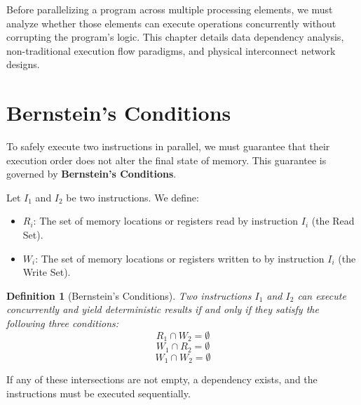 \documentclass[12pt,a4paper,openany]{book}
\newtheorem{definition}{Definition}[chapter]
\begin{document}
Before parallelizing a program across multiple processing elements, we must analyze whether those elements can execute operations concurrently without corrupting the program's logic. This chapter details data dependency analysis, non-traditional execution flow paradigms, and physical interconnect network designs.

\section{Bernstein's Conditions}
To safely execute two instructions in parallel, we must guarantee that their execution order does not alter the final state of memory. This guarantee is governed by \textbf{Bernstein's Conditions}.

Let $I_1$ and $I_2$ be two instructions. We define:
\begin{itemize}
    \item $R_i$: The set of memory locations or registers read by instruction $I_i$ (the Read Set).
    \item $W_i$: The set of memory locations or registers written to by instruction $I_i$ (the Write Set).
\end{itemize}

\begin{definition}[Bernstein's Conditions]
    Two instructions $I_1$ and $I_2$ can execute concurrently and yield deterministic results if and only if they satisfy the following three conditions:
    \begin{equation}
        R_1 \cap W_2 = \emptyset
    \end{equation}
    \begin{equation}
        W_1 \cap R_2 = \emptyset
    \end{equation}
    \begin{equation}
        W_1 \cap W_2 = \emptyset
    \end{equation}
\end{definition}

If any of these intersections are not empty, a dependency exists, and the instructions must be executed sequentially.
\end{document}
